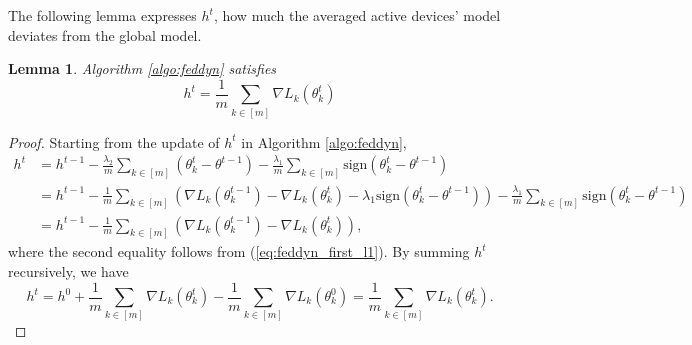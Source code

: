 \documentclass{article} %
\newtheorem{lemma}[theorem]{Lemma}
\begin{document}
The following lemma expresses $h^t$, how much the averaged active devices' model deviates from the global model.
\begin{lemma}\label{linear h}
Algorithm \ref{algo:feddyn} satisfies 
\begin{equation}\label{htlinear}
    h^t= \frac{1}{m}\sum_{k\in [m]}\nabla L_k(\theta_k^t) 
\end{equation}
\end{lemma}
\begin{proof}
Starting from the update of $h^t$ in Algorithm \ref{algo:feddyn},
\begin{align*}
    h^t &= h^{t-1} - \frac{\lambda_2}{m}\sum_{k\in [m]}(\theta_k^t-\theta^{t-1})-\frac{\lambda_1}{m}\sum_{k\in [m]} \mathrm{sign}(\theta_k^t-\theta^{t-1})\\
    &= h^{t-1} - \frac{1}{m}\sum_{k\in [m]}(\nabla L_k(\theta_k^{t-1})-\nabla L_k(\theta_k^t)-\lambda_1\mathrm{sign}(\theta_k^t-\theta^{t-1})) -\frac{\lambda_1}{m}\sum_{k\in [m]}\mathrm{sign}(\theta_k^t-\theta^{t-1}) \\
    &=h^{t-1}-\frac{1}{m}\sum_{k\in [m]}(\nabla L_k (\theta_k^{t-1})-\nabla L_k(\theta_k^{t})),
\end{align*}
where the second equality follows from (\ref{eq:feddyn_first_l1}). By summing $h^t$ recursively, we have
\begin{equation*}
    h^t = h^0 + \frac{1}{m}\sum_{k\in [m]}\nabla L_k(\theta_k^t) - \frac{1}{m}\sum_{k\in [m]}\nabla L_k(\theta_k^0) = \frac{1}{m}\sum_{k\in [m]}\nabla L_k(\theta_k^t).
\end{equation*}
\end{proof}
\end{document}
